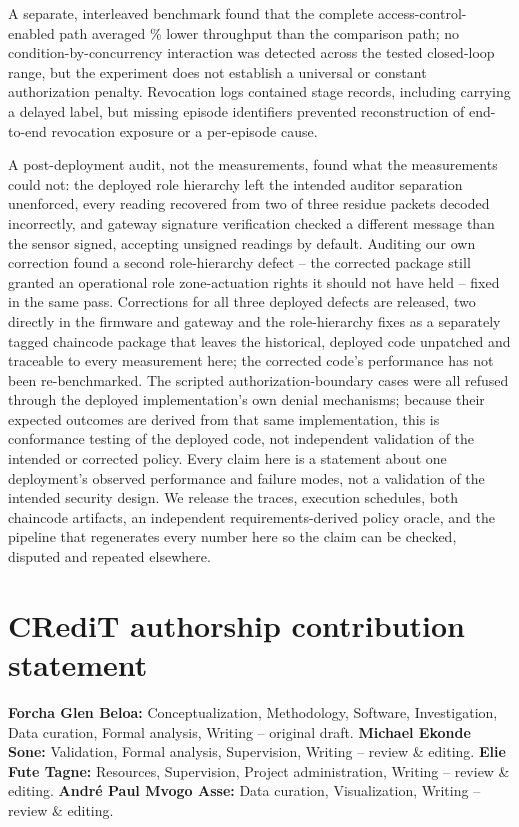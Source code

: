 \documentclass[a4paper,fleqn]{cas-sc}
\begin{document}
A separate, interleaved benchmark found that the complete
access-control-enabled path averaged \OverheadMeanPct\% lower throughput
than the comparison path; no condition-by-concurrency interaction was
detected across the tested closed-loop range, but the experiment does not
establish a universal or constant authorization penalty. Revocation logs
contained \RevEvents{} stage records, including \RevDelayed{} carrying a
delayed label, but missing episode identifiers prevented reconstruction
of end-to-end revocation exposure or a per-episode cause.

A post-deployment audit, not the measurements, found what the
measurements could not: the deployed role hierarchy left the intended
auditor separation unenforced, every reading recovered from two of three
residue packets decoded incorrectly, and gateway signature verification
checked a different message than the sensor signed, accepting unsigned
readings by default. Auditing our own correction found a second
role-hierarchy defect -- the corrected package still granted an
operational role zone-actuation rights it should not have held -- fixed
in the same pass. Corrections for all three deployed defects are
released, two directly in the firmware and gateway and the role-hierarchy
fixes as a separately tagged chaincode package that leaves the
historical, deployed code unpatched and traceable to every measurement
here; the corrected code's performance has not been re-benchmarked. The
\SecAttempts{} scripted authorization-boundary cases were all refused
through the deployed implementation's own denial mechanisms; because
their expected outcomes are derived from that same implementation, this
is conformance testing of the deployed code, not independent validation
of the intended or corrected policy. Every claim here is a statement
about one deployment's observed performance and failure modes, not a
validation of the intended security design. We release the traces,
execution schedules, both chaincode artifacts, an independent
requirements-derived policy oracle, and the pipeline that regenerates
every number here so the claim can be checked, disputed and repeated
elsewhere.

\section*{CRediT authorship contribution statement}

\textbf{Forcha Glen Beloa:} Conceptualization, Methodology, Software,
Investigation, Data curation, Formal analysis, Writing -- original draft.
\textbf{Michael Ekonde Sone:} Validation, Formal analysis, Supervision,
Writing -- review \& editing. \textbf{Elie Fute Tagne:} Resources,
Supervision, Project administration, Writing -- review \& editing.
\textbf{Andr\'{e} Paul Mvogo Asse:} Data curation, Visualization,
Writing -- review \& editing.
\end{document}
